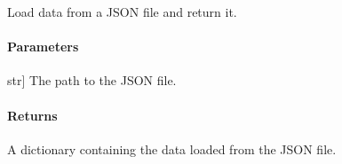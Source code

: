 \documentclass[letterpaper,10pt,english]{sphinxmanual}
\begin{document}

\begin{fulllineitems}
\label{\detokenize{main.transport_data:main.transport_data.transport_data.load_data_from_json}}
\pysigstartsignatures
{}
\pysigstopsignatures
\sphinxAtStartPar
Load data from a JSON file and return it.


\paragraph{Parameters}
\label{\detokenize{main.transport_data:id1}}\begin{description}
\sphinxlineitem{file\_path}{[}str{]}
\sphinxAtStartPar
The path to the JSON file.

\end{description}


\paragraph{Returns}
\label{\detokenize{main.transport_data:returns}}\begin{description}
\sphinxAtStartPar
A dictionary containing the data loaded from the JSON file.

\end{description}

\end{fulllineitems}

\end{document}
